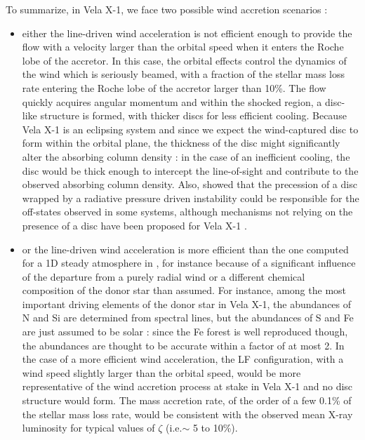 \documentclass{aa}
\makeatletter
\newcommand*{\eg}{e.g.\@\xspace}
\newcommand*{\ie}{i.e.\@\xspace}
\makeatother
\begin{document}
To summarize, in Vela X-1, we face two possible wind accretion scenarios :
\begin{itemize}
\item either the line-driven wind acceleration is not efficient enough to provide the flow with a velocity larger than the orbital speed when it enters the Roche lobe of the accretor. In this case, the orbital effects control the dynamics of the wind which is seriously beamed, with a fraction of the stellar mass loss rate entering the Roche lobe of the accretor larger than 10\%. The flow quickly acquires angular momentum and within the shocked region, a disc-like structure is formed, with thicker discs for less efficient cooling. Because Vela X-1 is an eclipsing system and since we expect the wind-captured disc to form within the orbital plane, the thickness of the disc might significantly alter the absorbing column density : in the case of an inefficient cooling, the disc would be thick enough to intercept the line-of-sight and contribute to the observed absorbing column density. Also, \cite{Foulkes:2010wa} showed that the precession of a disc wrapped by a radiative pressure driven instability \citep{Petterson1977a,Petterson1977} could be responsible for the off-states observed in some systems, although mechanisms not relying on the presence of a disc have been proposed for Vela X-1 \citep[see \eg][]{Manousakis2015c}.
\item or the line-driven wind acceleration is more efficient than the one computed for a 1D steady atmosphere in \cite{Sander2017}, for instance because of a significant influence of the departure from a purely radial wind or a different chemical composition of the donor star than assumed. For instance, among the most important driving elements of the donor star in Vela X-1, the abundances of N and Si are determined from spectral lines, but the abundances of S and Fe are just assumed to be solar \citep{Gimenez-Garcia2016} : since the Fe forest is well reproduced though, the abundances are thought to be accurate within a factor of at most 2. In the case of a more efficient wind acceleration, the LF configuration, with a wind speed slightly larger than the orbital speed, would be more representative of the wind accretion process at stake in Vela X-1 and no disc structure would form. The mass accretion rate, of the order of a few 0.1\% of the stellar mass loss rate, would be consistent with the observed mean X-ray luminosity for typical values of $\zeta$ (\ie $\sim$ 5 to 10\%).
\end{itemize}
\end{document}
